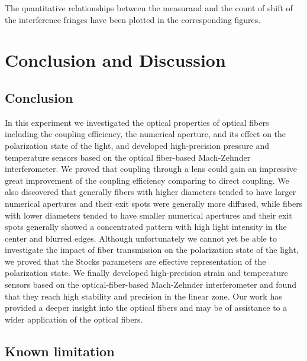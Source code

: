 \documentclass[10pt,a4paper,twocolumn,twoside,UTF8]{article}
\begin{document}
	The quantitative relationships between the measurand and the count of shift of the interference fringes have been plotted in the corresponding figures.


\section{Conclusion and Discussion}
	\subsection{Conclusion}
	In this experiment we investigated the optical properties of optical fibers including the coupling efficiency, the numerical aperture, and its effect on the polarization state of the light, 
	and developed high-precision pressure and temperature sensors based on the optical fiber-based Mach-Zehnder interferometer.
	We proved that coupling through a lens could gain an impressive great improvement of the coupling efficiency comparing to direct coupling.
	We also discovered that generally fibers with higher diameters tended to have larger numerical apertures and their exit spots were generally more diffused, 
	while fibers with lower diameters tended to have smaller numerical apertures and their exit spots generally showed a concentrated pattern with high light intensity in the center and blurred edges.
	Although unfortunately we cannot yet be able to investigate the impact of fiber transmission on the polarization state of the light, we proved that the Stocks parameters are effective representation of the polarization state.
	We finally developed high-precision strain and temperature sensors based on the optical-fiber-based Mach-Zehnder interferometer and found that they reach high stability and precision in the linear zone.
	Our work has provided a deeper insight into the optical fibers and may be of assistance to a wider application of the optical fibers.

	\subsection{Known limitation}
\end{document}
